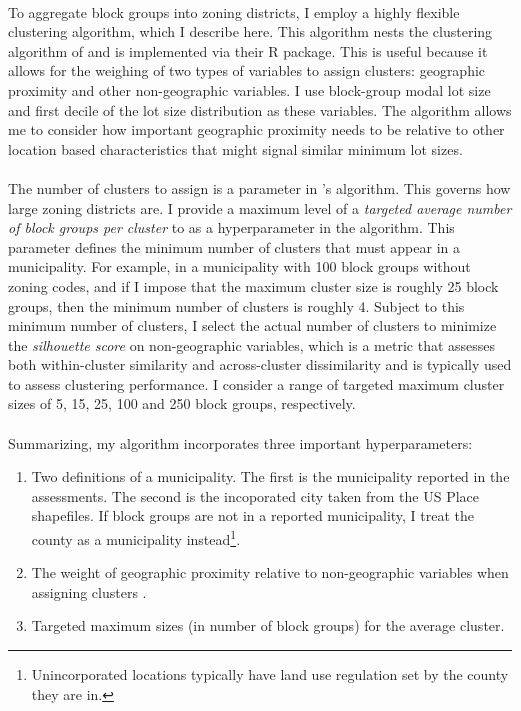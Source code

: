 \documentclass[12pt]{article}
\begin{document}
	\paragraph*{} To aggregate block groups into zoning districts, I employ a highly flexible clustering algorithm, which I describe here. This algorithm nests the clustering algorithm of \cite{Chavent2018} and is implemented via their R package. This is useful because it allows for the weighing of two types of variables to assign clusters: geographic proximity and other non-geographic variables. I use block-group modal lot size and first decile of the lot size distribution as these variables. The algorithm allows me to consider how important geographic proximity needs to be relative to other location based characteristics that might signal similar minimum lot sizes. 
	
	\paragraph*{}
	The number of clusters to assign is a parameter in \cite{Chavent2018}'s algorithm. This governs how large zoning districts are. I provide a maximum level of a \textit{targeted average number of block groups per cluster} to as a hyperparameter in the algorithm. This parameter defines the minimum number of clusters that must appear in a municipality. For example, in a municipality with 100 block groups without zoning codes, and if I impose that the maximum cluster size is roughly 25 block groups, then the minimum number of clusters is roughly 4. Subject to this minimum number of clusters, I select the actual number of clusters to minimize the \textit{silhouette score} on non-geographic variables, which is a metric that assesses both within-cluster similarity and across-cluster dissimilarity and is typically used to assess clustering performance. I consider a range of targeted maximum cluster sizes of 5, 15, 25, 100 and 250 block groups, respectively. 
	
	\paragraph*{}
	Summarizing, my algorithm incorporates three important hyperparameters:
	
	\begin{enumerate}
		
		\item Two definitions of a municipality. The first is the municipality reported in the assessments. The second is the incoporated city taken from the US Place shapefiles. If block groups are not in a reported municipality, I treat the county as a municipality instead\footnote{Unincorporated locations typically have land use regulation set by the county they are in.}. 
		
		\item The weight of geographic proximity relative to non-geographic variables when assigning clusters \citep{Chavent2018}.
		
		\item Targeted maximum sizes (in number of block groups) for the average cluster.
	
	\end{enumerate}
	
\end{document}
